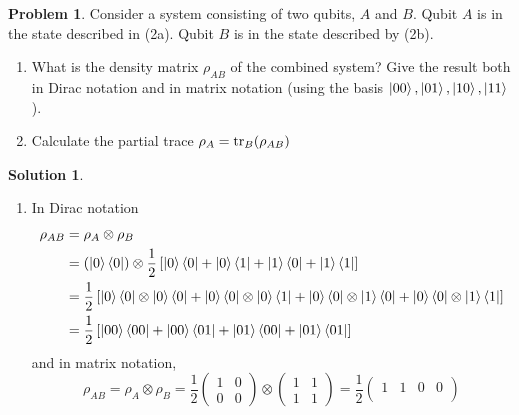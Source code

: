 \documentclass[10pt]{article}
\theoremstyle{definition}
\newtheorem{problem}{Problem}
\newtheorem{soln}{Solution}
\begin{document}
\begin{problem}
Consider a system consisting of two qubits, $A$ and $B$. Qubit $A$ is in the state described
in (2a). Qubit $B$ is in the state described by (2b).
\begin{enumerate}[label=(\alph*)]
  \item What is the density matrix $\rho_{AB}$ of the combined system? Give the result both in Dirac
        notation and in matrix notation (using the basis $\ket{00},\ket{01},\ket{10},\ket{11}$).
  \item Calculate the partial trace $\rho_A=\tr_B(\rho_{AB})$
\end{enumerate}
\end{problem}
\begin{soln}~
  \begin{enumerate}[label=(\alph*)]
    \item In Dirac notation
          \begin{align*}
            \rho_{AB} & =\rho_A\otimes \rho_B                                                                                                                                                    \\
                      & =(\ket{0}\bra{0})\otimes\frac{1}{2}\left[\ket{0}\bra{0}+\ket{0}\bra{1}+\ket{1}\bra{0}+\ket{1}\bra{1}\right]                                                              \\
                      & =\frac{1}{2}\left[\ket{0}\bra{0}\otimes\ket{0}\bra{0}+\ket{0}\bra{0}\otimes\ket{0}\bra{1}+\ket{0}\bra{0}\otimes\ket{1}\bra{0}+\ket{0}\bra{0}\otimes\ket{1}\bra{1}\right] \\
                      & =\frac{1}{2}\left[\ket{00}\bra{00}+\ket{00}\bra{01}+\ket{01}\bra{00}+\ket{01}\bra{01}\right]                                                                             \\
          \end{align*}
          and in matrix notation,
          $$\rho_{AB}=\rho_A\otimes \rho_B
            =\frac{1}{2}\begin{pmatrix}
              1 & 0 \\
              0 & 0
            \end{pmatrix}\otimes\begin{pmatrix}
              1 & 1 \\
              1 & 1
            \end{pmatrix}=\frac{1}{2}\begin{pmatrix}
              1 & 1 & 0 & 0 \\

\end{pmatrix}$$
\end{enumerate}
\end{soln}
\end{document}
